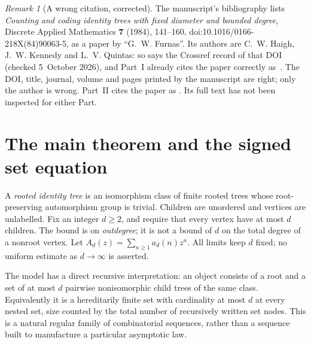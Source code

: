 \documentclass[11pt]{article}
\theoremstyle{definition}\newtheorem{definition}[theorem]{Definition}
\theoremstyle{remark}\newtheorem{remark}[theorem]{Remark}
\begin{document}
\begin{remark}[A wrong citation, corrected]\label{bit:cert:rem:furnas}
The manuscript's bibliography lists \emph{Counting and coding identity trees
with fixed diameter and bounded degree}, Discrete Applied Mathematics
\textbf{7} (1984), 141--160, doi:10.1016/0166-218X(84)90063-5, as a paper by
``G.~W. Furnas''. Its authors are C.~W. Haigh, J.~W. Kennedy and
L.~V. Quintas: so says the Crossref record of that DOI (checked 5~October
2026), and Part~I already cites the paper correctly
as~\cite{hkq}. The DOI, title, journal, volume and pages printed by the
manuscript are right; only the author is wrong. Part~II cites the paper as
\cite{hkq}. Its full text has not been inspected for either Part.
\end{remark}

\section{The main theorem and the signed set equation}\label{bit:cert:sec:main}
A \emph{rooted identity tree} is an isomorphism class of finite rooted trees
whose root-preserving automorphism group is trivial. Children are unordered
and vertices are unlabelled. Fix an integer $d\ge2$, and require that every
vertex have at most $d$ children. The bound is on \emph{outdegree}; it is not
a bound of $d$ on the total degree of a nonroot vertex. Let
$A_d(z)=\sum_{n\ge1}a_d(n)z^n$. All limits keep $d$ fixed; no uniform estimate
as $d\to\infty$ is asserted.

The model has a direct recursive interpretation: an object consists of a root
and a set of at most $d$ pairwise nonisomorphic child trees of the same class.
Equivalently it is a hereditarily finite set with cardinality at most $d$ at
every nested set, size counted by the total number of recursively written set
nodes. This is a natural regular family of combinatorial sequences, rather
than a sequence built to manufacture a particular asymptotic law.
\end{document}
